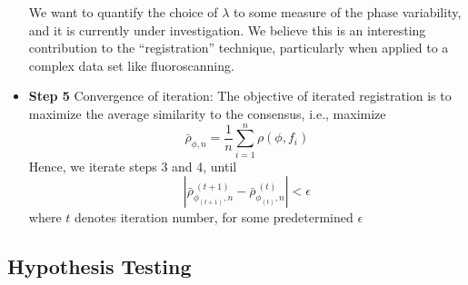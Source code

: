 \begin{itemize}
\begin{tcolorbox}[colback=green!5,colframe=green!40!black,title=Work in progress] %
We want to quantify the choice of $\lambda$ to some measure of the phase variability, and it is currently under investigation. We believe this is an interesting contribution to the ``registration'' technique, particularly when applied to a complex data set like fluoroscanning.
\end{tcolorbox}
\item {\bf{Step 5}} Convergence of iteration: The objective of iterated registration is to maximize the average similarity to the consensus, i.e., maximize 
\[ \bar{\rho}_{\phi, n} = \frac{1}{n} \sum \limits_{i = 1}^{n} \rho(\phi, f_i)\]
Hence, we iterate steps 3 and 4, until
\[ |\bar{\rho}_{\phi_{(t+1)}, n}^{\ (t+1)} - \bar{\rho}_{\phi_{(t)}, n}^{ \ (t)} | < \epsilon \]
where $t$ denotes iteration number, for some predetermined $\epsilon$
\end{itemize}

\subsection{Hypothesis Testing}
